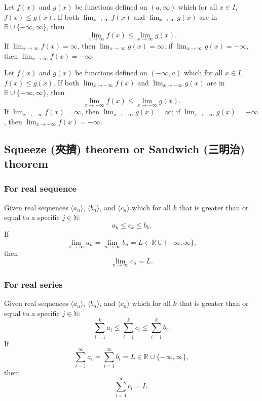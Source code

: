 Let $f(x)$ and $g(x)$ be functions defined on $(a,\infty)$ which for all $x\in I$, $f(x)\leq g(x)$. If both $\lim_{x\to\infty}f(x)$ and $\lim_{x\to\infty}g(x)$ are in $\mathbb{R}\cup\{-\infty,\infty\}$, then
\[\lim_{x\to\infty}f(x)\leq\lim_{x\to\infty}g(x).\]
If $\lim_{x\to\infty}f(x)=\infty$, then $\lim_{x\to\infty}g(x)=\infty$; if $\lim_{x\to\infty}g(x)=-\infty$, then $\lim_{x\to\infty}f(x)=-\infty$.

Let $f(x)$ and $g(x)$ be functions defined on $(-\infty,a)$ which for all $x\in I$, $f(x)\leq g(x)$. If both $\lim_{x\to-\infty}f(x)$ and $\lim_{x\to-\infty}g(x)$ are in $\mathbb{R}\cup\{-\infty,\infty\}$, then
\[\lim_{x\to-\infty}f(x)\leq\lim_{x\to-\infty}g(x).\]
If $\lim_{x\to-\infty}f(x)=\infty$, then $\lim_{x\to-\infty}g(x)=\infty$; if $\lim_{x\to-\infty}g(x)=-\infty$, then $\lim_{x\to-\infty}f(x)=-\infty$.
\subsection{Squeeze (夾擠) theorem or Sandwich (三明治) theorem}
\subsubsection{For real sequence}
Given real sequences $\langle a_n\rangle$, $\langle b_n\rangle$, and $\langle c_n\rangle$ which for all $k$ that is greater than or equal to a specific $j\in \mathbb{N}$:
\[a_k\leq c_k\leq b_k.\]
If
\[\lim_{n\to\infty}a_n=\lim_{n\to\infty}b_n=L\in\mathbb{R}\cup\{-\infty,\infty\},\]
then
\[\lim_{n\to\infty}c_n=L.\]
\subsubsection{For real series}
Given real sequences $\langle a_n\rangle$, $\langle b_n\rangle$, and $\langle c_n\rangle$ which for all $k$ that is greater than or equal to a specific $j\in \mathbb{N}$:
\[\sum_{i=1}^ka_i\leq\sum_{i=1}^kc_i\leq\sum_{i=1}^kb_i.\]
If
\[\sum_{i=1}^{\infty}a_i=\sum_{i=1}^{\infty}b_i=L\in\mathbb{R}\cup\{-\infty,\infty\},\]
then: 
\[\sum_{i=1}^{\infty}c_i=L.\]
